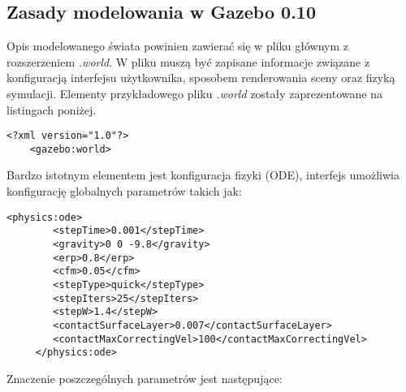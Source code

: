 	\subsection{Zasady modelowania w Gazebo 0.10}
	Opis modelowanego świata powinien zawierać się w pliku głównym z rozszerzeniem \textit{.world}.
	W pliku muszą być zapisane informacje związane z konfiguracją interfejsu użytkownika, sposobem renderowania sceny oraz fizyką symulacji.
	Elementy przykładowego pliku \textit{.world} zostały zaprezentowane na listingach poniżej.
	\begin{lstlisting}[name=gazebo_simple_world]
	<?xml version="1.0"?>
	<gazebo:world>
	\end{lstlisting}
	Bardzo istotnym elementem jest konfiguracja fizyki (ODE), interfejs umożliwia konfigurację globalnych parametrów takich jak:
	\begin{lstlisting}[name=gazebo_simple_world]
	<physics:ode>
		<stepTime>0.001</stepTime>
		<gravity>0 0 -9.8</gravity>		
		<erp>0.8</erp>
		<cfm>0.05</cfm>
		<stepType>quick</stepType>
		<stepIters>25</stepIters>
		<stepW>1.4</stepW>
		<contactSurfaceLayer>0.007</contactSurfaceLayer>
		<contactMaxCorrectingVel>100</contactMaxCorrectingVel>
	 </physics:ode>
	\end{lstlisting}
	Znaczenie poszczególnych parametrów jest następujące:
